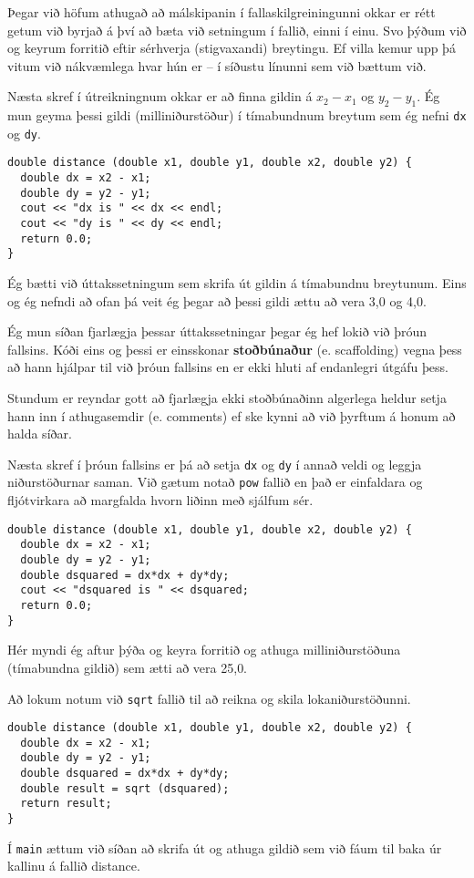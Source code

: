 Þegar við höfum athugað að málskipanin í fallaskilgreiningunni okkar er rétt getum við byrjað á því að bæta við setningum í fallið, einni í einu.
Svo þýðum við og keyrum forritið eftir sérhverja (stigvaxandi) breytingu.
Ef villa kemur upp þá vitum við nákvæmlega hvar hún er -- í síðustu línunni sem við bættum við.

Næsta skref í útreikningnum okkar er að finna gildin á $x_2 - x_1$ og $y_2 - y_1$.
Ég mun geyma þessi gildi (milliniðurstöður) í tímabundnum breytum sem ég nefni {\tt dx} og {\tt dy}.

\begin{verbatim}
double distance (double x1, double y1, double x2, double y2) {
  double dx = x2 - x1;
  double dy = y2 - y1;
  cout << "dx is " << dx << endl;
  cout << "dy is " << dy << endl;
  return 0.0;
}
\end{verbatim}
%
Ég bætti við úttakssetningum sem skrifa út gildin á tímabundnu breytunum. 
Eins og ég nefndi að ofan þá veit ég þegar að þessi gildi ættu að vera 3,0 og 4,0.


Ég mun síðan fjarlægja þessar úttakssetningar þegar ég hef lokið við þróun fallsins.
Kóði eins og þessi er einsskonar {\bf stoðbúnaður} (e. scaffolding) vegna þess að hann hjálpar til við þróun fallsins en er ekki hluti af endanlegri útgáfu þess.

Stundum er reyndar gott að fjarlægja ekki stoðbúnaðinn algerlega heldur setja hann inn í athugasemdir (e. comments) ef ske kynni að við þyrftum á honum að halda síðar.

Næsta skref í þróun fallsins er þá að setja {\tt dx} og {\tt dy} í annað veldi og leggja niðurstöðurnar saman.
Við gætum notað {\tt pow} fallið en það er einfaldara og fljótvirkara að margfalda hvorn liðinn með sjálfum sér.

\begin{verbatim}
double distance (double x1, double y1, double x2, double y2) {
  double dx = x2 - x1;
  double dy = y2 - y1;
  double dsquared = dx*dx + dy*dy;
  cout << "dsquared is " << dsquared;
  return 0.0;
}
\end{verbatim}
%
Hér myndi ég aftur þýða og keyra forritið og athuga milliniðurstöðuna (tímabundna gildið) sem ætti að vera 25,0.

Að lokum notum við {\tt sqrt} fallið til að reikna og skila lokaniðurstöðunni.

\begin{verbatim}
double distance (double x1, double y1, double x2, double y2) {
  double dx = x2 - x1;
  double dy = y2 - y1;
  double dsquared = dx*dx + dy*dy;
  double result = sqrt (dsquared);
  return result;
}
\end{verbatim}
%
Í {\tt main} ættum við síðan að skrifa út og athuga gildið sem við fáum til baka úr kallinu á fallið distance.


